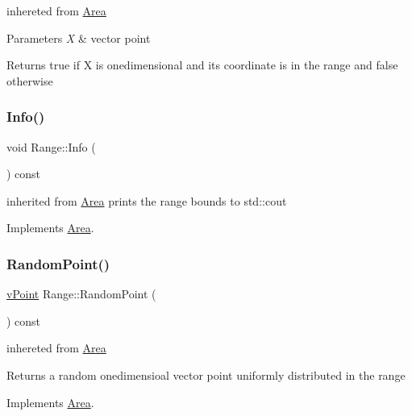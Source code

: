 inhereted from \hyperlink{class_area}{Area} 
\begin{DoxyParams}{Parameters}
{\em X} & vector point \\
\hline
\end{DoxyParams}
\begin{DoxyReturn}{Returns}
true if X is onedimensional and its coordinate is in the range and false otherwise 
\end{DoxyReturn}
\mbox{\label{class_range_adcbfaa8ea3d2e6da005573fd8146e952}} 
\subsubsection{\texorpdfstring{Info()}{Info()}}
{\footnotesize\ttfamily void Range\+::\+Info (\begin{DoxyParamCaption}{ }\end{DoxyParamCaption}) const\hspace{0.3cm}{\ttfamily [virtual]}}

inherited from \hyperlink{class_area}{Area} prints the range bounds to std\+::cout 

Implements \hyperlink{class_area_abc427001b3685b08cd836badffedfbbe}{Area}.

\mbox{\label{class_range_a71795faae3f99507eb999e7df0c248da}} 
\subsubsection{\texorpdfstring{Random\+Point()}{RandomPoint()}}
{\footnotesize\ttfamily \hyperlink{classv_point}{v\+Point} Range\+::\+Random\+Point (\begin{DoxyParamCaption}{ }\end{DoxyParamCaption}) const\hspace{0.3cm}{\ttfamily [virtual]}}

inhereted from \hyperlink{class_area}{Area} \begin{DoxyReturn}{Returns}
a random onedimensioal vector point uniformly distributed in the range 
\end{DoxyReturn}


Implements \hyperlink{class_area_a8a921495c0cca4095c8386f7b48ef086}{Area}.

\mbox{\label{class_range_ab75514ad9a6e950a15d901020a65119a}} 
